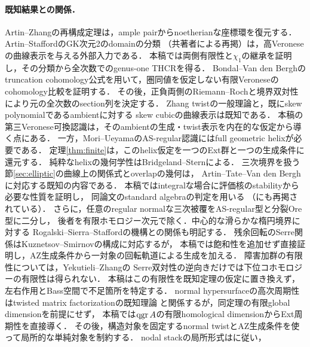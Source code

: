 \documentclass[11pt,a4paper]{ltjsarticle}
\begin{document}
\paragraph{既知結果との関係．}
Artin--Zhangの再構成定理\cite[Theorem 4.5]{AZ}は，ample pairからnoetherianな座標環を復元する．
Artin--Stafford\cite[Theorems 0.1--0.2, 0.4--0.5]{ASquadratic}のGK次元2のdomainの分類
（共著者による再掲\cite[Theorems 5.1--5.2, 5.5--5.6]{SVdBsurvey}）は，高Veroneseの曲線表示を与える外部入力である．
本稿では両側有限性と$\chi_1$の継承を証明し，その分類から全次数でのgenus-one THCRを得る．
Bondal--Van den Bergh\cite[\S4.1, (4.1), Lemmas 4.1.4--4.1.6]{BvdBGenerators}の
truncation cohomology公式を用いて，圏同値を仮定しない有限Veroneseのcohomology比較を証明する．
その後，正負両側のRiemann--Rochと境界双対性により元の全次数のsection列を決定する．
Zhang twistの一般理論\cite{ZhangTwist}と，既にskew polynomialであるambientに対する
skew cubicの曲線表示\cite[\S6.1]{BBvGCentral}は既知である．
本稿の第三Veronese可換認識は，そのambientの生成・twist表示を内在的な仮定から導く点にある．
一方，Mori--Ueyama\cite[Corollary 4.2]{MU}のAS-regular認識にはfull geometric helixが必要である．
定理\ref{thm:finite}は，このhelix仮定を一つのExt群と一つの生成条件に還元する．
純粋なhelixの幾何学性はBridgeland--Stern\cite[Theorem 5.3(ii)]{BS}による．
三次境界を扱う節\ref{sec:elliptic}の曲線上の関係式とoverlapの幾何は，
Artin--Tate--Van den Bergh\cite[Theorem 6.6, \S7]{ATV1990}に対応する既知の内容である．
本稿ではintegralな場合に評価核のstabilityから必要な性質を証明し，
同論文のstandard algebraの判定\cite[Theorem 1]{ATV1990}を用いる
（\cite[Theorem 2.2]{IM}にも再掲されている）．
さらに，任意のregular normalな三次被覆をAS-regular型と分裂Ore型に二分し，
後者を有限ホモロジー次元で除く．中心的な滑らかな楕円境界に対する
Rogalski--Sierra--Stafford\cite[Proposition 4.5, Remark 4.6]{RSS}の機構との関係も明記する．
残余回転のSerre関係はKuznetsov--Smirnov\cite[Theorem 2.8]{KS}の構成に対応するが，
本稿では飽和性を追加せず直接証明し，AZ生成条件から一対象の回転軌道による生成を加える．
障害加群の有限性については，Yekutieli--Zhang\cite[Theorem 2.3]{YZ}の
Serre双対性の逆向きだけでは下位コホモロジーの有限性は得られない．
本稿はこの有限性を既知定理の仮定に置き換えず，左右作用とBass空間で不足箇所を特定する．
normal hypersurfaceの高次周期性はtwisted matrix factorizationの既知理論
\cite[Theorem 4.2]{CCKM}と関係するが，同定理の有限global dimensionを前提にせず，
本稿では$\operatorname{qgr} A$の有限homological dimensionからExt周期性を直接導く．
その後，構造対象を固定するnormal twistとAZ生成条件を使って局所的な単純対象を制約する．
nodal stackの局所形式は\cite[Introduction]{LPstack}に従い，
\end{document}
